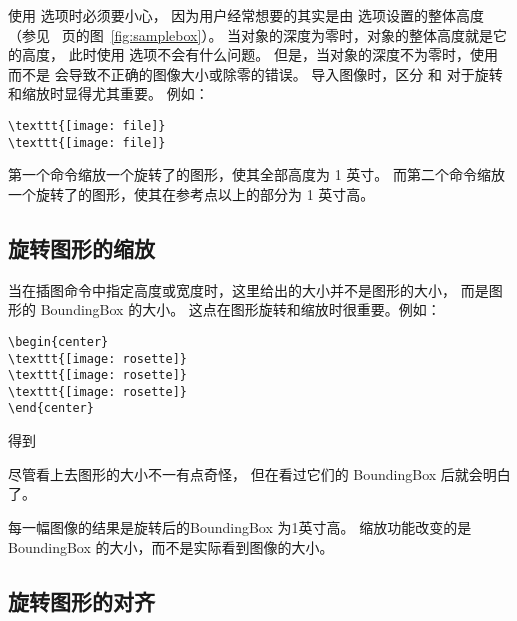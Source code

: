 使用  选项时必须要小心，
因为用户经常想要的其实是由  选项设置的整体高度
（参见~\pageref{fig:samplebox} 页的图~\ref{fig:samplebox}）。
当对象的深度为零时，对象的整体高度就是它的高度，
此时使用  选项不会有什么问题。
但是，当对象的深度不为零时，使用  而不是  会导致不正确的图像大小或除零的错误。
导入图像时，区分  和  对于旋转和缩放时显得尤其重要。
例如：
\begin{lstlisting}
\texttt{[image: file]}
\texttt{[image: file]}
\end{lstlisting}
第一个命令缩放一个旋转了的图形，使其全部高度为 1 英寸。
而第二个命令缩放一个旋转了的图形，使其在参考点以上的部分为 1 英寸高。

\subsection{旋转图形的缩放}\label{ssec:enlarge}
当在插图命令中指定高度或宽度时，这里给出的大小并不是图形的大小，
而是图形的 BoundingBox 的大小。
这点在图形旋转和缩放时很重要。例如：
\begin{lstlisting}
\begin{center}
\texttt{[image: rosette]}
\texttt{[image: rosette]}
\texttt{[image: rosette]}
\end{center}
\end{lstlisting}
得到

\begin{center}
	\resizebox*{!}{1in}{\usebox{\boxrosette}}
\end{center}
尽管看上去图形的大小不一有点奇怪，
但在看过它们的 BoundingBox 后就会明白了。

\begin{center}
	\resizebox*{!}{1in}{\usebox{\boxrosettebox}}
\end{center}
每一幅图像的结果是旋转后的BoundingBox 为1英寸高。
缩放功能改变的是BoundingBox 的大小，而不是实际看到图像的大小。


\subsection{旋转图形的对齐}\label{ssec:ralign}

